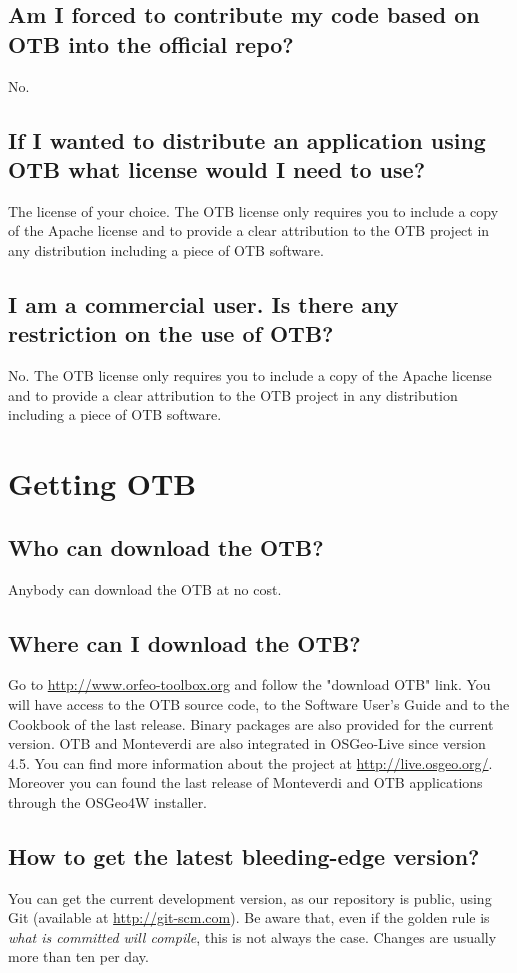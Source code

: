 \subsection{Am I forced to contribute my code based on OTB into the official
  repo?}
No.

\subsection{If I wanted to distribute an application using OTB what license
  would I need to use?}
The license of your choice. The OTB license only requires you to include
a copy of the Apache license and to provide a clear attribution to the OTB
project in any distribution including a piece of OTB software.

\subsection{I am a commercial user. Is there any restriction on the
  use of OTB?}
No. The OTB license only requires you to include a copy of the Apache license
and to provide a clear attribution to the OTB project in any distribution
including a piece of OTB software.

\section{Getting OTB}

\subsection{Who can download the OTB?}
Anybody can download the OTB at no cost.

\subsection{Where can I download the OTB?}
Go to \url{http://www.orfeo-toolbox.org}
 and follow the "download OTB" link. You will have access to the OTB
source code, to the Software User's Guide and to the Cookbook of the last release.
Binary packages are also provided for the current version.
OTB and Monteverdi are also integrated in OSGeo-Live since version 4.5.
You can find more information about the project at \url{http://live.osgeo.org/}.
Moreover you can found the last release of Monteverdi and OTB applications through
the OSGeo4W installer.

\subsection{How to get the latest bleeding-edge version?}\label{sec:FAQGit}
You can get the current development version, as our repository is public, using Git (available at \url{http://git-scm.com}). Be aware that, even if the golden rule is {\em what is committed will compile}, this is not always the case. Changes are usually more than ten per day.

